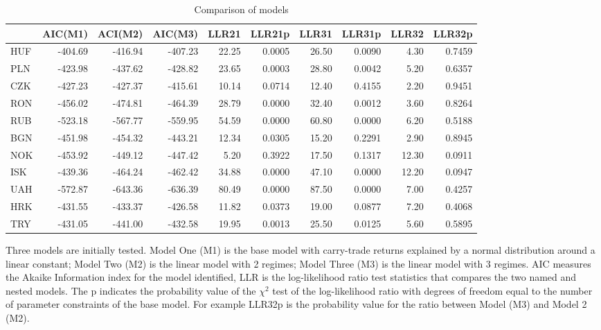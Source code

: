 \documentclass[12pt, a4paper, oneside]{article} %
\begin{document}
\begin{landscape}
\begin{table}[ht]
\begin{threeparttable}
\centering
\begin{tabular}{l|rrrrrrrrr}
  \hline
 & AIC(M1) & ACI(M2) & AIC(M3) & LLR21 & LLR21p & LLR31 & LLR31p & LLR32 & LLR32p \\ 
  \hline
HUF & -404.69 & -416.94 & -407.23 & 22.25 & 0.0005 & 26.50 & 0.0090 & 4.30 & 0.7459 \\ 
  PLN & -423.98 & -437.62 & -428.82 & 23.65 & 0.0003 & 28.80 & 0.0042 & 5.20 & 0.6357 \\ 
  CZK & -427.23 & -427.37 & -415.61 & 10.14 & 0.0714 & 12.40 & 0.4155 & 2.20 & 0.9451 \\ 
  RON & -456.02 & -474.81 & -464.39 & 28.79 & 0.0000 & 32.40 & 0.0012 & 3.60 & 0.8264 \\ 
  RUB & -523.18 & -567.77 & -559.95 & 54.59 & 0.0000 & 60.80 & 0.0000 & 6.20 & 0.5188 \\ 
  BGN & -451.98 & -454.32 & -443.21 & 12.34 & 0.0305 & 15.20 & 0.2291 & 2.90 & 0.8945 \\ 
  NOK & -453.92 & -449.12 & -447.42 & 5.20 & 0.3922 & 17.50 & 0.1317 & 12.30 & 0.0911 \\ 
  ISK & -439.36 & -464.24 & -462.42 & 34.88 & 0.0000 & 47.10 & 0.0000 & 12.20 & 0.0947 \\ 
  UAH & -572.87 & -643.36 & -636.39 & 80.49 & 0.0000 & 87.50 & 0.0000 & 7.00 & 0.4257 \\ 
  HRK & -431.55 & -433.37 & -426.58 & 11.82 & 0.0373 & 19.00 & 0.0877 & 7.20 & 0.4068 \\ 
  TRY & -431.05 & -441.00 & -432.58 & 19.95 & 0.0013 & 25.50 & 0.0125 & 5.60 & 0.5895 \\ 
   \hline
\end{tabular}
\begin{tablenotes}
\small
\item Three models are initially tested.  Model One (M1) is the base model with carry-trade returns explained by a normal distribution around a linear constant; Model Two (M2) is the linear model with 2 regimes; Model Three (M3) is the linear model with 3 regimes.  AIC measures the Akaike Information index for the model identified, LLR is the log-likelihood ratio test statistics that compares the two named and nested models.  The p indicates the probability value of the $\chi^2$ test of the log-likelihood ratio with degrees of freedom equal to the number of parameter constraints of the base model.  For example LLR32p is the probability value for the ratio between Model (M3) and Model 2 (M2).
\end{tablenotes}
\caption{Comparison of models}
\label{tabref:comptab2}
\end{threeparttable}
\end{table} 
\end{landscape}
\end{document}
